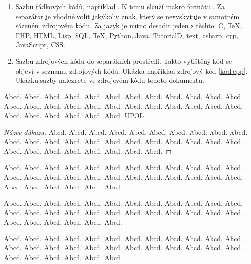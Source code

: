 \documentclass[
  program=itk,
  biblatex,
  language=czech,
  figures=false,
  glossaries,
  index
]{kidiplom}
\begin{document}
\begin{enumerate}
\item Sazbu řádkových kódů, například . K tomu slouží makro formátu . Za separátor je vhodné volit jakýkoliv znak, který se nevyskytuje v samotném sázeném zdrojovém kódu. Za jazyk je nutno dosadit jeden z těchto: C, TeX, PHP, HTML, Lisp, SQL, TeX, Python, Java, TutorialD, text, csharp, cpp, JavaScript, CSS.

\item Sazbu zdrojových kódu do separátních prostředí. Takto vytištěný kód se objeví v seznamu zdrojových kódů. Ukázka například zdrojový kód \ref{kod:cpp}. Ukázku sazby naleznete ve zdrojovém kódu tohoto dokumentu.
\end{enumerate}


\begin{definition}
Abcd. Abcd. Abcd. Abcd. Abcd. Abcd. Abcd. Abcd. Abcd. Abcd. Abcd. Abcd. Abcd. Abcd. Abcd. Abcd. Abcd. Abcd. Abcd. Abcd. Abcd. Abcd. Abcd. Abcd. Abcd. Abcd. Abcd. Abcd. Abcd. Abcd. \gls{UPOL}
\end{definition}

\begin{proof}[Název důkazu]
Abcd. Abcd. Abcd. Abcd. Abcd. Abcd. Abcd. Abcd. Abcd. Abcd. Abcd. Abcd. Abcd. Abcd. Abcd. Abcd. Abcd. Abcd. Abcd. Abcd. Abcd. Abcd. Abcd. Abcd. Abcd. Abcd. Abcd. Abcd. Abcd. Abcd.
\end{proof}

\begin{remark}
Abcd. Abcd. Abcd. Abcd. Abcd. Abcd. Abcd. Abcd. Abcd. Abcd. Abcd. Abcd. Abcd. Abcd. Abcd. Abcd. Abcd. Abcd. Abcd. Abcd. Abcd. Abcd. Abcd. Abcd. Abcd. Abcd. Abcd. Abcd. Abcd. Abcd.
\end{remark}

\begin{example}
Abcd. Abcd. Abcd. Abcd. Abcd. Abcd. Abcd. Abcd. Abcd. Abcd. Abcd. Abcd. Abcd. Abcd. Abcd. Abcd. Abcd. Abcd. Abcd. Abcd. Abcd. Abcd. Abcd. Abcd. Abcd. Abcd. Abcd. Abcd. Abcd. Abcd.
\end{example}

\begin{lemma}
Abcd. Abcd. Abcd. Abcd. Abcd. Abcd. Abcd. Abcd. Abcd. Abcd. Abcd. Abcd. Abcd. Abcd. Abcd. Abcd. Abcd. Abcd. Abcd. Abcd. Abcd. Abcd. Abcd. Abcd. Abcd. Abcd. Abcd. Abcd. Abcd. Abcd.
\end{lemma}
\end{document}
